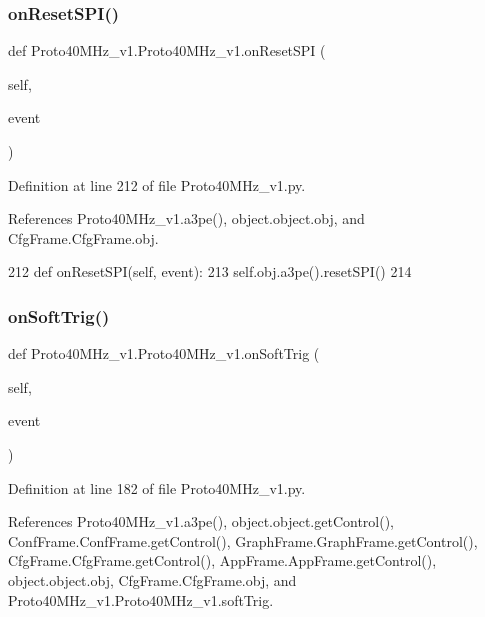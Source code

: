 \subsubsection{\texorpdfstring{on\+Reset\+S\+P\+I()}{onResetSPI()}}
{\footnotesize\ttfamily def Proto40\+M\+Hz\+\_\+v1.\+Proto40\+M\+Hz\+\_\+v1.\+on\+Reset\+S\+PI (\begin{DoxyParamCaption}\item[{}]{self,  }\item[{}]{event }\end{DoxyParamCaption})}



Definition at line 212 of file Proto40\+M\+Hz\+\_\+v1.\+py.



References Proto40\+M\+Hz\+\_\+v1.\+a3pe(), object.\+object.\+obj, and Cfg\+Frame.\+Cfg\+Frame.\+obj.


\begin{DoxyCode}
212     \textcolor{keyword}{def }onResetSPI(self, event):
213         self.obj.a3pe().resetSPI()
214 
\end{DoxyCode}
\mbox{\label{classProto40MHz__v1_1_1Proto40MHz__v1_a20a1ff18e3e5385432b6b16aafcf5cb4}} 
\subsubsection{\texorpdfstring{on\+Soft\+Trig()}{onSoftTrig()}}
{\footnotesize\ttfamily def Proto40\+M\+Hz\+\_\+v1.\+Proto40\+M\+Hz\+\_\+v1.\+on\+Soft\+Trig (\begin{DoxyParamCaption}\item[{}]{self,  }\item[{}]{event }\end{DoxyParamCaption})}



Definition at line 182 of file Proto40\+M\+Hz\+\_\+v1.\+py.



References Proto40\+M\+Hz\+\_\+v1.\+a3pe(), object.\+object.\+get\+Control(), Conf\+Frame.\+Conf\+Frame.\+get\+Control(), Graph\+Frame.\+Graph\+Frame.\+get\+Control(), Cfg\+Frame.\+Cfg\+Frame.\+get\+Control(), App\+Frame.\+App\+Frame.\+get\+Control(), object.\+object.\+obj, Cfg\+Frame.\+Cfg\+Frame.\+obj, and Proto40\+M\+Hz\+\_\+v1.\+Proto40\+M\+Hz\+\_\+v1.\+soft\+Trig.




